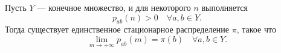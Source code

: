 \begin{corollary}
    Пусть $Y$ --- конечное множество, и для некоторого $n$ выполняется
    $$p_{ab}(n) > 0 \quad \forall a, b\in Y.$$
    Тогда существует единственное стационарное распределение $\pi$, такое что
    $$\underset{m\to+\infty}{\lim} p_{ab}(m) = \pi(b)\quad \forall a, b\in Y.$$
\end{corollary}
\newpage
